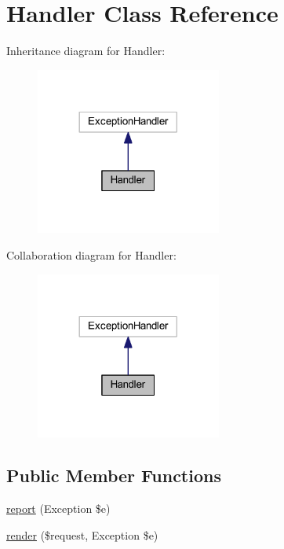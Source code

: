 \hypertarget{class_app_1_1_exceptions_1_1_handler}{}\section{Handler Class Reference}
\label{class_app_1_1_exceptions_1_1_handler}


Inheritance diagram for Handler\+:
\nopagebreak
\begin{figure}[H]
\begin{center}
\leavevmode
\includegraphics[width=173pt]{class_app_1_1_exceptions_1_1_handler__inherit__graph}
\end{center}
\end{figure}


Collaboration diagram for Handler\+:
\nopagebreak
\begin{figure}[H]
\begin{center}
\leavevmode
\includegraphics[width=173pt]{class_app_1_1_exceptions_1_1_handler__coll__graph}
\end{center}
\end{figure}
\subsection*{Public Member Functions}
\begin{DoxyCompactItemize}
\item 
\mbox{\hyperlink{class_app_1_1_exceptions_1_1_handler_ac0ed66852194d5c444146cec8eec8ca4}{report}} (Exception \$e)
\item 
\mbox{\hyperlink{class_app_1_1_exceptions_1_1_handler_a7f412df510b6ecdb4aac9455d71af13a}{render}} (\$request, Exception \$e)
\end{DoxyCompactItemize}
